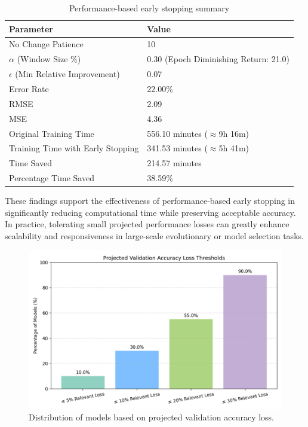 \begin{table}[ht]
\centering
\begin{tabular}{ll}
\toprule
\textbf{Parameter} & \textbf{Value} \\
\midrule
No Change Patience & 10 \\
$\alpha$ (Window Size \%) & 0.30 (Epoch Diminishing Return: 21.0) \\
$\epsilon$ (Min Relative Improvement) & 0.07 \\
Error Rate & 22.00\% \\
RMSE & 2.09 \\
MSE & 4.36 \\
Original Training Time & 556.10 minutes ($\approx$9h 16m) \\
Training Time with Early Stopping & 341.53 minutes ($\approx$5h 41m) \\
Time Saved & 214.57 minutes \\
Percentage Time Saved & 38.59\% \\
\bottomrule
\end{tabular}
\caption{Performance-based early stopping summary}
\label{tab:performance_stopping_summary}
\end{table}

These findings support the effectiveness of performance-based early stopping in significantly reducing computational time while preserving acceptable accuracy. In practice, tolerating small projected performance losses can greatly enhance scalability and responsiveness in large-scale evolutionary or model selection tasks.


\begin{figure}[ht]
    \centering
    \includegraphics[width=0.85\linewidth]{Pictures/val_accuracy_loss_percentages.png}
    \caption{Distribution of models based on projected validation accuracy loss.}
    \label{fig:performanceStop}
\end{figure}


